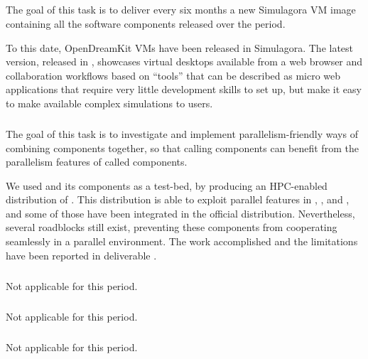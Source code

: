 
  \subparagraph{}
  \label{component-architecture@simulagora-dev}
  The goal of this task is to deliver every six months a new Simulagora
  VM image containing all the software components released over the
  period.

  To this date,  OpenDreamKit VMs have been released in
  Simulagora. The latest version, released in ,
  showcases virtual desktops available from a web browser and
  collaboration workflows based on ``tools'' that can be described as
  micro web applications that require very little development skills
  to set up, but make it easy to make available complex simulations to
  users. 
  
  \subparagraph{}
  The goal of this task is to investigate and implement
  parallelism-friendly ways of combining components together, so that
  calling components can benefit from the parallelism features of
  called components.

  We used \Sage and its components as a test-bed, by producing an
  HPC-enabled distribution of \Sage. This distribution is able to
  exploit parallel features in \Linbox, \GAP, \Singular and \PariGP,
  and some of those have been integrated in the official \Sage
  distribution. Nevertheless, several roadblocks still exist,
  preventing these components from cooperating seamlessly in a
  parallel environment. The work accomplished and the limitations have
  been reported in deliverable  
  .
  
  \subparagraph{}
  \label{component-architecture@extract-smc}
  Not applicable for this period.
  
  \subparagraph{}
  \label{component-architecture@workflow}
  Not applicable for this period.
  
  \subparagraph{}
  \label{component-architecture@oommf-python-interface}
  Not applicable for this period.

  

